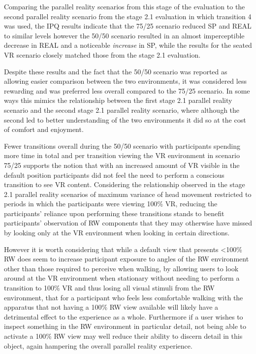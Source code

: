 Comparing the parallel reality scenarios from this stage of the evaluation to the second parallel reality scenario from the stage 2.1 evaluation in which transition 4 was used, the IPQ results indicate that the 75/25 scenario reduced SP and REAL to similar levels however the 50/50 scenario resulted in an almost imperceptible decrease in REAL and a noticeable \textit{increase} in SP, while the results for the seated VR scenario closely matched those from the stage 2.1 evaluation.

Despite these results and the fact that the 50/50 scenario was reported as allowing easier comparison between the two environments, it was considered less rewarding and was preferred less overall compared to the 75/25 scenario. In some ways this mimics the relationship between the first stage 2.1 parallel reality scenario and the second stage 2.1 parallel reality scenario, where although the second led to better understanding of the two environments it did so at the cost of comfort and enjoyment.

Fewer transitions overall during the 50/50 scenario with participants spending more time in total and per transition viewing the VR environment in scenario 75/25 supports the notion that with an increased amount of VR visible in the default position participants did not feel the need to perform a conscious transition to see VR content. Considering the relationship observed in the stage 2.1 parallel reality scenarios of maximum variance of head movement restricted to periods in which the participants were viewing 100\% VR, reducing the participants' reliance upon performing these transitions stands to benefit participants' observation of RW components that they may otherwise have missed by looking only at the VR environment when looking in certain directions.

However it is worth considering that while a default view that presents \textless 100\% RW does seem to increase participant exposure to angles of the RW environment other than those required to perceive when walking, by allowing users to look around at the VR environment when stationary without needing to perform a transition to 100\% VR and thus losing all visual stimuli from the RW environment, that for a participant who feels less comfortable walking with the apparatus that not having a 100\% RW view available will likely have a detrimental effect to the experience as a whole. Furthermore if a user wishes to inspect something in the RW environment in particular detail, not being able to activate a 100\% RW view may well reduce their ability to discern detail in this object, again hampering the overall parallel reality experience.

